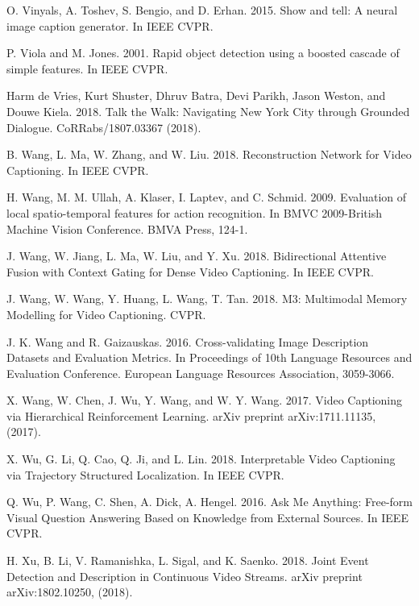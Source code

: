 \documentclass[10pt,journal,compsoc]{IEEEtran}
\begin{document}
\begin{thebibliography}{1}
O. Vinyals, A. Toshev, S. Bengio, and D. Erhan. 2015. Show and tell: A neural image caption generator. In IEEE CVPR.

P. Viola and M. Jones. 2001. Rapid object detection using a boosted cascade of simple features. In IEEE CVPR.

Harm de Vries, Kurt Shuster, Dhruv Batra, Devi Parikh, Jason Weston, and Douwe Kiela. 2018.  Talk the Walk: Navigating New York City through Grounded Dialogue. CoRRabs/1807.03367 (2018).

B. Wang, L. Ma, W. Zhang, and W. Liu. 2018. Reconstruction Network for Video Captioning. In IEEE CVPR.

H. Wang, M. M. Ullah, A. Klaser, I. Laptev, and C. Schmid. 2009. Evaluation of local spatio-temporal features for action recognition. In BMVC 2009-British Machine Vision Conference. BMVA Press, 124-1.

% 
J. Wang, W. Jiang, L. Ma, W. Liu, and Y. Xu. 2018.  Bidirectional Attentive Fusion with Context Gating for Dense Video Captioning. In IEEE CVPR.

J. Wang, W. Wang, Y. Huang, L. Wang, T. Tan. 2018.  M3: Multimodal Memory Modelling for Video Captioning. CVPR.

J. K. Wang and R. Gaizauskas. 2016.  Cross-validating Image Description Datasets and Evaluation Metrics. In Proceedings of 10th Language Resources and Evaluation Conference. European Language Resources Association, 3059-3066.

X. Wang, W. Chen, J. Wu, Y. Wang, and W. Y. Wang. 2017. Video Captioning via Hierarchical Reinforcement Learning. arXiv preprint arXiv:1711.11135, (2017).

X. Wu, G. Li, Q. Cao, Q. Ji, and L. Lin. 2018. Interpretable Video Captioning via Trajectory Structured Localization. In IEEE CVPR.

Q. Wu, P. Wang, C. Shen, A. Dick, A. Hengel. 2016. Ask Me Anything: Free-form Visual Question Answering Based on Knowledge from External Sources. In IEEE CVPR.

H. Xu, B. Li, V. Ramanishka, L. Sigal, and K. Saenko. 2018. Joint Event Detection and
Description in Continuous Video Streams. arXiv preprint arXiv:1802.10250, (2018).


\end{thebibliography}
\end{document}
